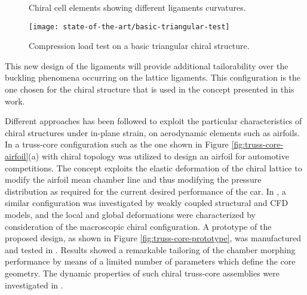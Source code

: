   \begin{figure}[!htpb]
    \centering
     \qquad
    \caption[Chiral cell elements showing different ligaments curvatures]{Chiral cell elements showing different ligaments curvatures. \cite{Ramstein2016}}
    \label{fig:ramstein}
  \end{figure}

  \begin{figure}[!htpb]
    \centering
    \texttt{[image: state-of-the-art/basic-triangular-test]}
    \caption[Compression load test on a basic triangular chiral structure]{Compression load test on a basic triangular chiral structure. \cite{Ramstein2016}}\label{fig:basic-triangular-test}
  \end{figure}

  This new design of the ligaments will provide additional tailorability over the buckling phenomena occurring on the lattice ligaments. This configuration is the one chosen for the chiral structure that is used in the concept presented in this work.

  Different approaches has been followed to exploit the particular characteristics of chiral structures under in-plane strain, on aerodynamic elements such as airfoils. In \cite{Bornengo2005} a truss-core configuration such as the one shown in Figure \ref{fig:truss-core-airfoil}(a) with chiral topology was utilized to design an airfoil for automotive competitions. The concept exploits the elastic deformation of the chiral lattice to modify the airfoil mean chamber line and thus modifying the pressure distribution as required for the current desired performance of the car. In \cite{Spadoni2007a}, a similar configuration was investigated by weakly coupled structural and CFD models, and the local and global deformations were characterized by consideration of the macroscopic chiral configuration. A prototype of the proposed design, as shown in Figure \ref{fig:truss-core-prototype}, was manufactured and tested in \cite{Spadoni2007b}. Results showed a remarkable tailoring of the chamber morphing performance by means of a limited number of parameters which define the core geometry. The dynamic properties of such chiral truss-core assemblies were investigated in \cite{Spadoni2006}.


